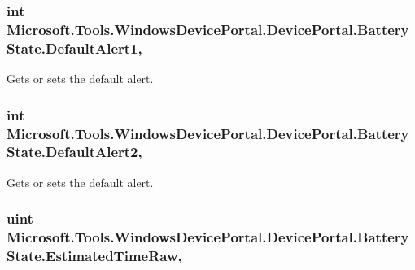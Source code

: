 \subsubsection[{\texorpdfstring{Default\+Alert1}{DefaultAlert1}}]{\setlength{\rightskip}{0pt plus 5cm}int Microsoft.\+Tools.\+Windows\+Device\+Portal.\+Device\+Portal.\+Battery\+State.\+Default\+Alert1\hspace{0.3cm}{\ttfamily [get]}, {\ttfamily [set]}}\hypertarget{class_microsoft_1_1_tools_1_1_windows_device_portal_1_1_device_portal_1_1_battery_state_adc269646db3f4e91db904fa1bf3ec49d}{}\label{class_microsoft_1_1_tools_1_1_windows_device_portal_1_1_device_portal_1_1_battery_state_adc269646db3f4e91db904fa1bf3ec49d}


Gets or sets the default alert. 

\subsubsection[{\texorpdfstring{Default\+Alert2}{DefaultAlert2}}]{\setlength{\rightskip}{0pt plus 5cm}int Microsoft.\+Tools.\+Windows\+Device\+Portal.\+Device\+Portal.\+Battery\+State.\+Default\+Alert2\hspace{0.3cm}{\ttfamily [get]}, {\ttfamily [set]}}\hypertarget{class_microsoft_1_1_tools_1_1_windows_device_portal_1_1_device_portal_1_1_battery_state_a03e05ea8c25d935b1216b3746da024aa}{}\label{class_microsoft_1_1_tools_1_1_windows_device_portal_1_1_device_portal_1_1_battery_state_a03e05ea8c25d935b1216b3746da024aa}


Gets or sets the default alert. 

\subsubsection[{\texorpdfstring{Estimated\+Time\+Raw}{EstimatedTimeRaw}}]{\setlength{\rightskip}{0pt plus 5cm}uint Microsoft.\+Tools.\+Windows\+Device\+Portal.\+Device\+Portal.\+Battery\+State.\+Estimated\+Time\+Raw\hspace{0.3cm}{\ttfamily [get]}, {\ttfamily [set]}}\hypertarget{class_microsoft_1_1_tools_1_1_windows_device_portal_1_1_device_portal_1_1_battery_state_a91e8fe33c791e7ad58cc234d9cd5d935}{}\label{class_microsoft_1_1_tools_1_1_windows_device_portal_1_1_device_portal_1_1_battery_state_a91e8fe33c791e7ad58cc234d9cd5d935}



